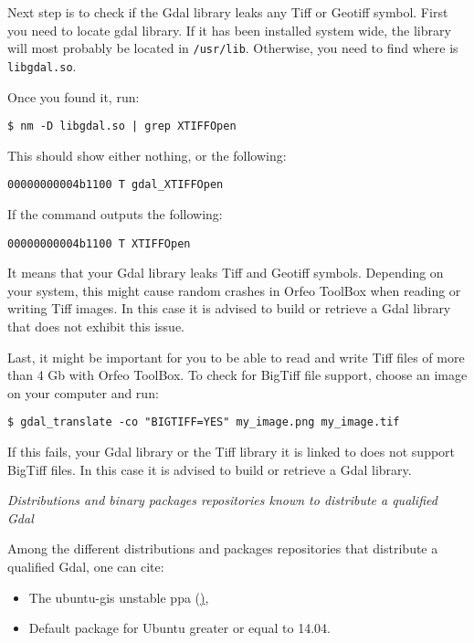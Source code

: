 Next step is to check if the Gdal library leaks any Tiff or Geotiff symbol. First you need to locate gdal library. If it has been installed system wide, the library will most probably be located in \texttt{/usr/lib}. Otherwise, you need to find where is \texttt{libgdal.so}.

Once you found it, run:
\begin{verbatim}
$ nm -D libgdal.so | grep XTIFFOpen
\end{verbatim}

This should show either nothing, or the following:

\begin{verbatim}
00000000004b1100 T gdal_XTIFFOpen
\end{verbatim}

If the command outputs the following:

\begin{verbatim}
00000000004b1100 T XTIFFOpen
\end{verbatim}

It means that your Gdal library leaks Tiff and Geotiff symbols. Depending on your system, this might cause random crashes in Orfeo ToolBox when reading or writing Tiff images. In this case it is advised to build or retrieve a Gdal library that does not exhibit this issue.

Last, it might be important for you to be able to read and write Tiff files of more than 4 Gb with Orfeo ToolBox. To check for BigTiff file support, choose an image on your computer and run:
\begin{verbatim}
$ gdal_translate -co "BIGTIFF=YES" my_image.png my_image.tif
\end{verbatim}

If this fails, your Gdal library or the Tiff library it is linked to does not support BigTiff files. In this case it is advised to build or retrieve a Gdal library.

\emph{Distributions and binary packages repositories known to distribute a qualified Gdal}


Among the different distributions and packages repositories that distribute a qualified Gdal, one can cite:
\begin{itemize}
\item The ubuntu-gis unstable ppa (\href{https://launchpad.net/~ubuntugis/+archive/ubuntugis-unstable}),
\item Default package for Ubuntu greater or equal to 14.04.
\end{itemize}

